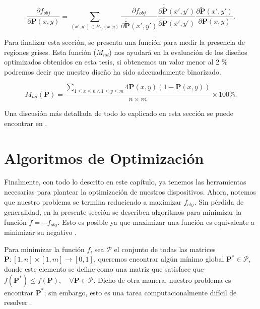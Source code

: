 \begin{equation}
  \frac{\partial f_{obj}}{\partial \boldsymbol{P}(x, y)} = \displaystyle\sum_{(x', y') \in \overline{B}_{r_f}(x, y)}
  \frac{\partial f_{obj}}{\partial \widetilde{\widetilde{\boldsymbol{P}}}(x', y')}
  \frac{\partial \widetilde{\widetilde{\boldsymbol{P}}}(x', y')}{\partial \widetilde{\boldsymbol{P}}(x', y')}
   \frac{\partial \widetilde{\boldsymbol{P}}(x', y')}{\partial \boldsymbol{P}(x, y)}.
  \label{eq:fobjgrad}
\end{equation}

Para finalizar esta sección, se presenta una función para medir la presencia de regiones grises.
Esta función ($M_{nd}$) nos ayudará en la evaluación de los diseños optimizados obtenidos en esta tesis,
si obtenemos un valor menor al 2 \% podremos decir que nuestro diseño ha sido adecuadamente binarizado.

\begin{equation}
  M_{nd} (\boldsymbol{P}) = \frac{\sum_{1 \leq x \leq n \land 1 \leq y \leq m}
  4 \boldsymbol{P}(x, y)(1 - \boldsymbol{P}(x, y))}{n \times m} \times 100 \%.
\label{eq:grayscale}
\end{equation}

Una discusión más detallada de todo lo explicado en esta sección se puede encontrar en \cite{Lazarov2016}.

\section{Algoritmos de Optimización}\label{sec:alg-opt}

Finalmente, con todo lo descrito en este capítulo, ya tenemos las herramientas necesarias
para plantear la optimización de nuestros dispositivos.
Ahora, notemos que nuestro problema se termina reduciendo a maximizar $f_{obj}$.
Sin pérdida de generalidad, en la presente sección se describen algoritmos
para minimizar la función $f = -f_{obj}$.
Esto es posible ya que maximizar una función es equivalente a minimizar su negativo \citep{Mykel2019}.


Para minimizar la función $f$, sea $\pmb{\mathscr{P}}$ el conjunto de todas las matrices 
$\boldsymbol{P}: [1, n] \times [1, m] \to [0, 1]$, queremos encontrar algún mínimo global 
$\boldsymbol{P^{*}} \in \pmb{\mathscr{P}}$, 
donde este elemento se define como una matriz que satisface que
$f(\boldsymbol{P^{*}}) \leq f(\boldsymbol{P}), \quad \forall \boldsymbol{P} \in \pmb{\mathscr{P}}$. 
Dicho de otra manera, nuestro problema es encontrar $\boldsymbol{P^{*}}$; sin embargo,
esto es una tarea computacionalmente difícil de resolver \citep{Angeris2021}.

